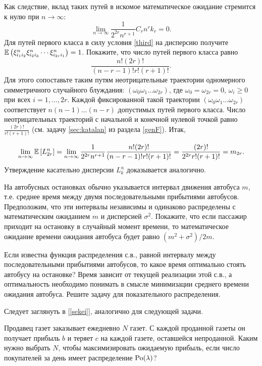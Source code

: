 \begin{ordre}
Как следствие, вклад таких путей в искомое математическое ожидание стремится к нулю при $n\to \infty $: \[\mathop{\lim }\limits_{n\to \infty } \frac{1}{2^{2r} n^{r+1} } C_{r} n^{r} k_{r} =0.\] Для путей первого класса в силу условия \ref{third} на дисперсию получите $\mathrm{{\mathbb E}} \left(\xi _{i_{1} i_{2} }^{n} \xi _{i_{2} i_{3} }^{n} \cdots \xi _{i_{2r} i_{1} }^{n}\right) =1$. Покажите, что число путей первого класса равно \[\frac{n!(2r)!}{(n-r-1)!r!(r+1)!}. \] Для этого сопоставьте таким путям неотрицательные траектории одномерного симметричного случайного блуждания: $\left(\omega _{0} \omega _{1} \ldots \omega _{2r} \right)$, где $\omega _{0} =\omega _{2r} =0$, $\omega _{i} \ge 0$ при всех $i=1,\ldots ,2r$. Каждой фиксированной такой траектории $\left(\omega _{0} \omega _{1} \ldots \omega _{2r} \right)$ соответствует $n(n-1)\ldots (n-r)$ допустимых путей первого класса. Число неотрицательных траекторий с начальной и конечной нулевой точкой равно $\frac{(2r)!}{r!(r+1)!} $ (см. задачу \ref{sec:katalan} из раздела \ref{genF}).
Итак, 

\[\mathop{\lim }\limits_{n\to \infty } \mathrm{{\mathbb E}}\left[L_{2r}^{n} \right]=\mathop{\lim }\limits_{n\to \infty } \frac{1}{2^{2r} n^{r+1} } \frac{n!(2r)!}{(n-r-1)!r!(r+1)!} =\frac{(2r)!}{2^{2r} r!(r+1)!} =m_{2r} .\] 
Утверждение касательно дисперсии $L_{k}^{n} $ доказывается аналогично.

\end{ordre}

\begin{problem}
На автобусных остановках обычно указывается интервал движения автобуса $m$, т.е. среднее время между двумя последовательными прибытиями автобусов. Предположим, что эти интервалы независимы и одинаково распределены с математическим ожиданием $m$ и дисперсией $\sigma^2$. Покажите, что если пассажир приходит на остановку в случайный момент времени, то математическое ожидание времени ожидания автобуса будет равно $\left(m^2+\sigma^2\right)/2m$.

Если известна функция распределения с.в., равной интервалу между последовательными прибытиями автобусов, то какое время оптимально стоять автобусу на остановке? Время зависит от текущей реализации этой с.в.,    а оптимальность необходимо понимать в смысле минимизации среднего времени ожидания автобуса. Решите задачу для показательного распределения.
\end{problem}
\begin{remark}
Следует заглянуть в [\ref{sekei}], аналогично для следующей задачи.
\end{remark}

\begin{problem}
Продавец газет заказывает ежедневно $N$ газет. С каждой проданной газеты он получает прибыль $b$ и теряет $c$ на каждой газете, оставшейся непроданной.  Каким нужно выбрать  $N$, чтобы максимизировать ожидаемую прибыль, если число покупателей за день имеет распределение $\mathrm{Po}(\lambda)$? 
\end{problem}